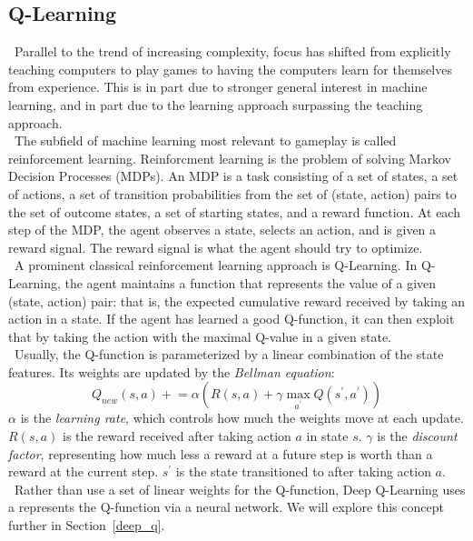 \documentclass[conference]{IEEEtran}
\begin{document}
\subsection{Q-Learning}\label{ql}
\noindent\ Parallel to the trend of increasing complexity, focus has shifted
from explicitly teaching computers to play games to having the computers learn
for themselves from experience. This is in part due to stronger general
interest in machine learning, and in part due to the learning approach
surpassing the teaching approach.\\
\indent\ The subfield of machine learning most relevant to gameplay is called
reinforcement learning. Reinforcment learning is the problem of solving Markov
Decision Processes (MDPs).  An MDP is a task consisting of a set of states, a
set of actions, a set of transition probabilities from the set of (state,
action) pairs to the set of outcome states, a set of starting states, and a
reward function. At each step of the MDP, the agent observes a state, selects
an action, and is given a reward signal. The reward signal is what the agent
should try to optimize.\\
\indent\ A prominent classical reinforcement learning approach is Q-Learning.
In Q-Learning, the agent maintains a function that represents the value of a
given (state, action) pair: that is, the expected cumulative reward received by
taking an action in a state. If the agent has learned a good Q-function, it can
then exploit that by taking the action with the maximal Q-value in a given
state.\\
\indent\ Usually, the Q-function is parameterized by a linear combination of
the state features. Its weights are updated by the \emph{Bellman equation}:
\begin{equation}
    Q_{new}(s, a)\mathrel{+}=\alpha\left(R(s,a)+\gamma\max_{a^{'}}Q(s^{'},a^{'})\right)
\end{equation}
$\alpha$ is the \emph{learning rate}, which controls how much the weights move
at each update.  $R(s, a)$ is the reward received after taking action $a$ in
state $s$. $\gamma$ is the \emph{discount factor}, representing how much less
a reward at a future step is worth than a reward at the current step. $s^{'}$
is the state transitioned to after taking action $a$.\\
\indent\ Rather than use a set of linear weights for the Q-function, Deep
Q-Learning uses a represents the Q-function via a neural network. We will
explore this concept further in Section~\ref{deep_q}.
\end{document}
